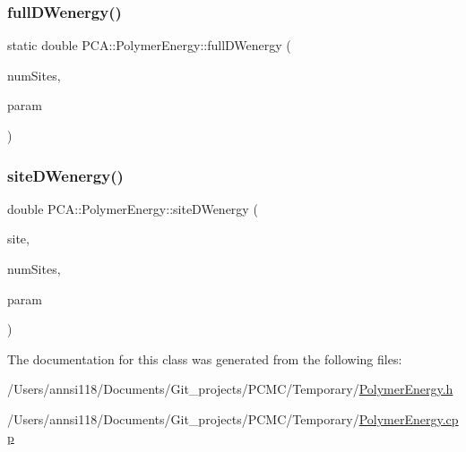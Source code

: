 \subsubsection{\texorpdfstring{full\+D\+Wenergy()}{fullDWenergy()}}
{\footnotesize\ttfamily static double P\+C\+A\+::\+Polymer\+Energy\+::full\+D\+Wenergy (\begin{DoxyParamCaption}\item[{int}]{num\+Sites,  }\item[{const \hyperlink{class_p_c_a_1_1_polymer_energy_1_1_d_wparam}{D\+Wparam} \&}]{param }\end{DoxyParamCaption})\hspace{0.3cm}{\ttfamily [static]}}

\hypertarget{class_p_c_a_1_1_polymer_energy_a835b345f0e6151a18962e4fb06a922bf}{}\label{class_p_c_a_1_1_polymer_energy_a835b345f0e6151a18962e4fb06a922bf} 
\subsubsection{\texorpdfstring{site\+D\+Wenergy()}{siteDWenergy()}}
{\footnotesize\ttfamily double P\+C\+A\+::\+Polymer\+Energy\+::site\+D\+Wenergy (\begin{DoxyParamCaption}\item[{int}]{site,  }\item[{int}]{num\+Sites,  }\item[{const \hyperlink{class_p_c_a_1_1_polymer_energy_1_1_d_wparam}{D\+Wparam} \&}]{param }\end{DoxyParamCaption})\hspace{0.3cm}{\ttfamily [static]}}



The documentation for this class was generated from the following files\+:\begin{DoxyCompactItemize}
\item 
/\+Users/annsi118/\+Documents/\+Git\+\_\+projects/\+P\+C\+M\+C/\+Temporary/\hyperlink{_polymer_energy_8h}{Polymer\+Energy.\+h}\item 
/\+Users/annsi118/\+Documents/\+Git\+\_\+projects/\+P\+C\+M\+C/\+Temporary/\hyperlink{_polymer_energy_8cpp}{Polymer\+Energy.\+cpp}\end{DoxyCompactItemize}
